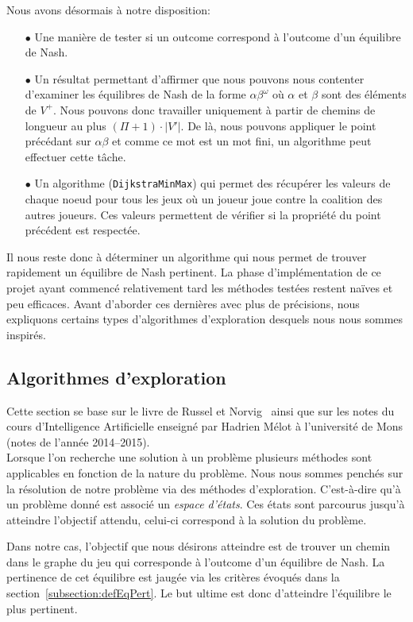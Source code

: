 Nous avons désormais à notre disposition:
\begin{itemize}
	\item[$\bullet$] Une manière de tester si un outcome correspond à l'outcome d'un équilibre de Nash.
	\item[$\bullet$] Un résultat permettant d'affirmer que nous pouvons nous contenter d'examiner les équilibres de Nash de la forme $\alpha \beta^{\omega}$ où $\alpha$ et $\beta$ sont des éléments de $V^{+}$. Nous pouvons donc travailler uniquement à partir de chemins de longueur au plus $(\Pi + 1)\cdot |V'|$. De là, nous pouvons appliquer le point précédant sur $\alpha\beta$ et comme ce mot est un mot fini, un algorithme peut effectuer cette tâche. 
	\item[$\bullet$] Un algorithme (\verb|DijkstraMinMax|) qui permet des récupérer les valeurs de chaque noeud pour tous les jeux  où un joueur joue contre la coalition des autres joueurs. Ces valeurs permettent de vérifier si la propriété du point précédent est respectée.
\end{itemize}
\smallskip
\indent Il nous reste donc à déterminer un algorithme qui nous permet de trouver rapidement un équilibre de Nash pertinent. La phase d'implémentation de ce projet ayant commencé relativement tard les méthodes testées restent naïves et peu efficaces. Avant d'aborder ces dernières avec plus de précisions, nous expliquons certains types d'algorithmes d'exploration desquels nous nous sommes inspirés.

\subsection{Algorithmes d'exploration}

Cette section se base sur le livre de Russel et Norvig~\cite{artInt} ainsi que sur les notes du cours d'Intelligence Artificielle enseigné par Hadrien Mélot à l'université de Mons (notes de l'année 2014--2015).\\


Lorsque l'on recherche une solution à un problème plusieurs méthodes sont applicables en fonction de la nature du problème. Nous nous sommes penchés sur la résolution de notre problème via des méthodes d'exploration. C'est-à-dire qu'à un problème donné est associé un \emph{espace d'états}. Ces états sont parcourus jusqu'à atteindre l'objectif attendu, celui-ci correspond à la solution du problème.

Dans notre cas, l'objectif que nous désirons atteindre est de trouver un chemin dans le graphe du jeu qui corresponde à l'outcome d'un équilibre de Nash. La pertinence de cet équilibre est jaugée via les critères évoqués dans la section~\ref{subsection:defEqPert}. Le but ultime est donc d'atteindre l'équilibre le plus pertinent.

